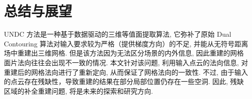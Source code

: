 \section{总结与展望}
UNDC 方法是一种基于数据驱动的三维等值面提取算法, 它弥补了原始 Dual Contouring 算法对输入要求较为严格（提供梯度方向）的不足, 并能从无符号距离场中重建出三维网格. 
但是该方法因为无法区分场景的内外信息, 因此重建的网格面片法向往往会出现不一致的情况. 
本文针对该问题, 利用输入点云的法向信息, 对重建后的网格法向进行了重新定向, 从而保证了网格法向的一致性. 不过, 由于输入的点云存在残缺性，导致重建的结果在部分局部位置仍存在一些空洞. 因此, 残缺区域的补全重建问题, 将是未来的探索和研究方向.

\printbibliography%
